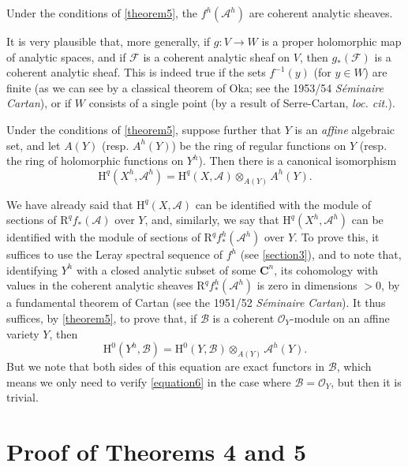 \documentclass{article}
\theoremstyle{plain}
\newenvironment{corollary}[1]
    {\renewcommand\theinnercustomcorollary{#1}\innercustomcorollary}
    {\endinnercustomcorollary}
\theoremstyle{definition}
\newcommand{\sh}[1]{{\mathscr{#1}}}
\newcommand{\HH}{\mathrm{H}}
\newcommand{\RR}{\mathrm{R}}
\newcommand{\oldpage}[1]{\marginpar{\footnotesize$\Big\vert$ \textit{p.~#1}}}
\begin{document}
\begin{corollary}{2}
\label{corollary2-5}
  Under the conditions of \cref{theorem5}, the $f^h(\sh{A}^h)$ are coherent analytic sheaves.
\end{corollary}

\oldpage{2-10}
It is very plausible that, more generally, if $g\colon V\to W$ is a proper holomorphic map of analytic spaces, and if $\sh{F}$ is a coherent analytic sheaf on $V$, then $g_*(\sh{F})$ is a coherent analytic sheaf.
This is indeed true if the sets $f^{-1}(y)$ (for $y\in W$) are finite (as we can see by a classical theorem of Oka; see the 1953/54 \emph{S\'{e}minaire Cartan}), or if $W$ consists of a single point (by a result of Serre-Cartan, \emph{loc. cit.}).

\begin{corollary}{3}
\label{corollary3-5}
  Under the conditions of \cref{theorem5}, suppose further that $Y$ is an \emph{affine} algebraic set, and let $A(Y)$ (resp. $A^h(Y)$) be the ring of regular functions on $Y$ (resp. the ring of holomorphic functions on $Y^h$).
  Then there is a canonical isomorphism
  \[
  \label{equation5}
    \HH^q(X^h,\sh{A}^h) = \HH^q(X,\sh{A})\otimes_{A(Y)}A^h(Y).
    \tag{5}
  \]
\end{corollary}

We have already said that $\HH^q(X,\sh{A})$ can be identified with the module of sections of $\RR^qf_*(\sh{A})$ over $Y$, and, similarly, we say that $\HH^q(X^h,\sh{A}^h)$ can be identified with the module of sections of $\RR^qf_*^h(\sh{A}^h)$ over $Y$.
To prove this, it suffices to use the Leray spectral sequence of $f^h$ (see \cref{section3}), and to note that, identifying $Y^h$ with a closed analytic subset of some $\mathbf{C}^n$, its cohomology with values in the coherent analytic sheaves $\RR^qf_*^h(\sh{A}^h)$ is zero in dimensions $>0$, by a fundamental theorem of Cartan (see the 1951/52 \emph{S\'{e}minaire Cartan}).
It thus suffices, by \cref{theorem5}, to prove that, if $\sh{B}$ is a coherent $\sh{O}_Y$-module on an affine variety $Y$, then
\[
\label{equation6}
  \HH^0(Y^h,\sh{B}) = \HH^0(Y,\sh{B})\otimes_{A(Y)}\sh{A}^h(Y).
  \tag{6}
\]
But we note that both sides of this equation are exact functors in $\sh{B}$, which means we only need to verify \cref{equation6} in the case where $\sh{B}=\sh{O}_Y$, but then it is trivial.


\section{Proof of Theorems 4 and 5}
\label{section7}
\end{document}
